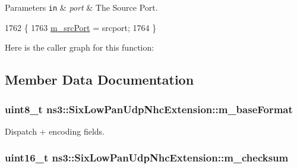 \begin{DoxyParams}[1]{Parameters}
\mbox{\tt in}  & {\em port} & The Source Port. \\
\hline
\end{DoxyParams}

\begin{DoxyCode}
1762 \{
1763   \hyperlink{classns3_1_1SixLowPanUdpNhcExtension_aeb61efab041137331d4a3a64574e7f5d}{m\_srcPort} = srcport;
1764 \}
\end{DoxyCode}


Here is the caller graph for this function\+:




\subsection{Member Data Documentation}
\subsubsection[{\texorpdfstring{m\+\_\+base\+Format}{m_baseFormat}}]{\setlength{\rightskip}{0pt plus 5cm}uint8\+\_\+t ns3\+::\+Six\+Low\+Pan\+Udp\+Nhc\+Extension\+::m\+\_\+base\+Format\hspace{0.3cm}{\ttfamily [private]}}\hypertarget{classns3_1_1SixLowPanUdpNhcExtension_a211cd2c058f85925f4b6a2812425805e}{}\label{classns3_1_1SixLowPanUdpNhcExtension_a211cd2c058f85925f4b6a2812425805e}


Dispatch + encoding fields. 

\subsubsection[{\texorpdfstring{m\+\_\+checksum}{m_checksum}}]{\setlength{\rightskip}{0pt plus 5cm}uint16\+\_\+t ns3\+::\+Six\+Low\+Pan\+Udp\+Nhc\+Extension\+::m\+\_\+checksum\hspace{0.3cm}{\ttfamily [private]}}\hypertarget{classns3_1_1SixLowPanUdpNhcExtension_a54c1249805aaf395370a2eb92dc7e08d}{}\label{classns3_1_1SixLowPanUdpNhcExtension_a54c1249805aaf395370a2eb92dc7e08d}


